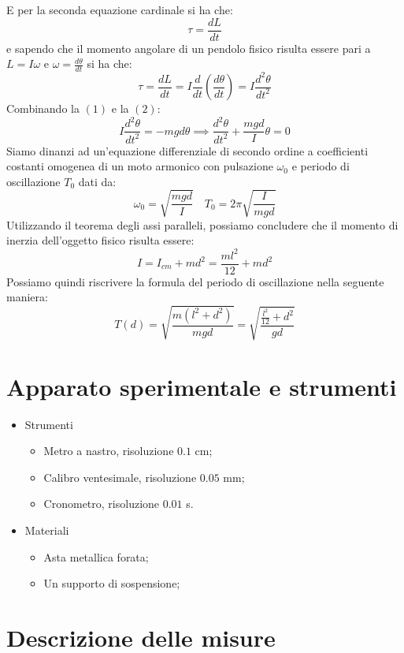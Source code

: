 \documentclass{article}
\begin{document}
E per la seconda equazione cardinale si ha che:
\begin{equation}
	\tau = \frac{dL}{dt}
\end{equation}
e sapendo che il momento angolare di un pendolo fisico risulta essere pari a $L = I\omega$ e $\omega = \frac{d\theta}{dt}$ si ha che:
$$
	\tau = \frac{dL}{dt} = I\frac{d}{dt} \left(\frac{d\theta}{dt} \right) = I\frac{d^2 \theta}{dt^2}
$$
Combinando la $(1)$ e la $(2)$:
\begin{equation}
	I\frac{d^2 \theta}{dt^2} = -mgd\theta \implies \frac{d^2 \theta}{dt^2} + \frac{mgd}{I}\theta = 0 
\end{equation}
Siamo dinanzi ad un'equazione differenziale di secondo ordine a coefficienti costanti omogenea di un moto armonico con pulsazione $\omega_0$ e periodo di oscillazione $T_0$ dati da:
$$\omega_0 = \sqrt{\frac{mgd}{I}} \, \, \, \, \, \, T_0 = 2\pi\sqrt{\frac{I}{mgd}}$$
Utilizzando il teorema degli assi paralleli, possiamo concludere che il momento di inerzia dell'oggetto fisico risulta essere:
$$
	I = I_{cm} + md^2 = \frac{ml^2}{12} + md^2
$$
Possiamo quindi riscrivere la formula del periodo di oscillazione nella seguente maniera:
\begin{equation}
	T(d) = \sqrt{\frac{m(l^2 + d^2)}{mgd}} = \sqrt{\frac{\frac{l^2}{12} + d^2}{gd}}
\end{equation}
\section{Apparato sperimentale e strumenti}

\begin{itemize}
	\item Strumenti 
	\begin{itemize}
		\item Metro a nastro, risoluzione $0.1$ cm;
		\item Calibro ventesimale, risoluzione $0.05$ mm;
		\item Cronometro, risoluzione $0.01 $ s.
	\end{itemize}
	\item Materiali
	\begin{itemize}
		\item Asta metallica forata;
		\item Un supporto di sospensione;
	\end{itemize}
\end{itemize}

\section{Descrizione delle misure}
\end{document}
